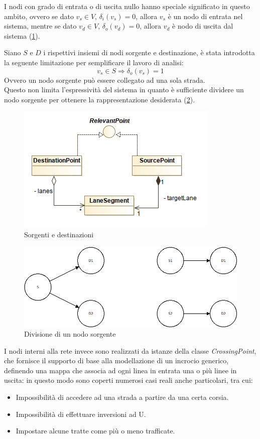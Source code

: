 I nodi con grado di entrata o di uscita nullo hanno speciale significato in questo ambito, ovvero se dato $v_s \in V$, $\delta_i(v_s) = 0$, allora $v_s$ è un nodo di entrata nel sistema, mentre se dato $v_d \in V$, $\delta_o(v_d) = 0$, allora $v_d$ è nodo di uscita dal sistema (\ref{fig:model01}).

Siano $S$ e $D$ i rispettivi insiemi di nodi sorgente e destinazione, è stata introdotta la seguente limitazione per semplificare il lavoro di analisi:
$$v_s \in S \Rightarrow \delta_o(v_s) = 1$$
Ovvero un nodo sorgente può essere collegato ad una sola strada.\\
Questo non limita l'espressività del sistema in quanto è sufficiente dividere un nodo sorgente per ottenere la rappresentazione desiderata (\ref{fig:graph00}).
\begin{figure}[h]
	\centering
	\includegraphics[scale=0.5]{img/model01}
	\caption{Sorgenti e destinazioni}
	\label{fig:model01}
\end{figure}

\begin{figure}[h]
	\centering
	\includegraphics[scale=0.5]{img/graph00}
	\caption{Divisione di un nodo sorgente}
	\label{fig:graph00}
\end{figure}

I nodi interni alla rete invece sono realizzati da istanze della classe \textit{CrossingPoint}, che fornisce il supporto di base alla modellazione di un incrocio generico, definendo una mappa che associa ad ogni linea in entrata una o più linee in uscita: in questo modo sono coperti numerosi casi reali anche particolari, tra cui:
\begin{itemize}
	\item Impossibilità di accedere ad una strada a partire da una certa corsia.
	\item Impossibilità di effettuare inversioni ad U.
	\item Impostare alcune tratte come più o meno trafficate.
\end{itemize}

